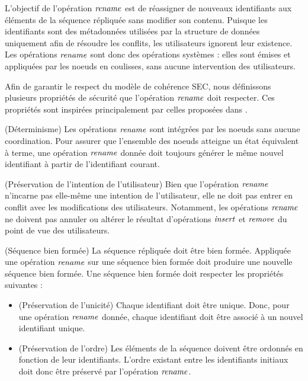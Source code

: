 \label{sec:def-rename-op}

L'objectif de l'opération $\mathit{rename}$ est de réassigner de nouveaux identifiants aux éléments de la séquence répliquée sans modifier son contenu.
Puisque les identifiants sont des métadonnées utilisées par la structure de données uniquement afin de résoudre les conflits, les utilisateurs ignorent leur existence.
Les opérations $\mathit{rename}$ sont donc des opérations systèmes : elles sont émises et appliquées par les noeuds en coulisses, sans aucune intervention des utilisateurs.

Afin de garantir le respect du modèle de cohérence \ac{SEC}, nous définissons plusieurs propriétés de sécurité que l'opération $\mathit{rename}$ doit respecter.
Ces propriétés sont inspirées principalement par celles proposées dans \cite{zawirski:hal-01248197}.

\begin{property}(Déterminisme)
  Les opérations $\mathit{rename}$ sont intégrées par les noeuds sans aucune coordination.
  Pour assurer que l'ensemble des noeuds atteigne un état équivalent à terme, une opération $\mathit{rename}$ donnée doit toujours générer le même nouvel identifiant à partir de l'identifiant courant.
\end{property}

\begin{property}(Préservation de l'intention de l'utilisateur)
  \label{prop:rename-op-intention-preservation}
  Bien que l'opération $\mathit{rename}$ n'incarne pas elle-même une intention de l'utilisateur, elle ne doit pas entrer en conflit avec les modifications des utilisateurs.
  Notamment, les opérations $\mathit{rename}$ ne doivent pas annuler ou altérer le résultat d'opérations $\mathit{insert}$ et $\mathit{remove}$ du point de vue des utilisateurs.
\end{property}

\begin{property}(Séquence bien formée)
  La séquence répliquée doit être bien formée.
  Appliquée une opération $\mathit{rename}$ sur une séquence bien formée doit produire une nouvelle séquence bien formée.
  Une séquence bien formée doit respecter les propriétés suivantes :
  \begin{itemize}[noitemsep]
    \item[~]
    \begin{subproperty}(Préservation de l'unicité)
      Chaque identifiant doit être unique.
      Donc, pour une opération $\mathit{rename}$ donnée, chaque identifiant doit être associé à un nouvel identifiant unique.
    \end{subproperty}
    \item[~]
    \begin{subproperty}(Préservation de l'ordre)
      \label{prop:order}
      Les éléments de la séquence doivent être ordonnés en fonction de leur identifiants.
      L'ordre existant entre les identifiants initiaux doit donc être préservé par l'opération $\mathit{rename}$.
    \end{subproperty}
  \end{itemize}
\end{property}

